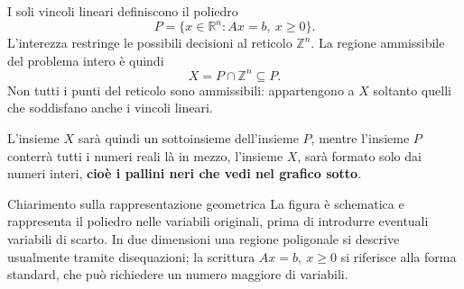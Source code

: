 I soli vincoli lineari definiscono il poliedro
\[
P=\{x\in\mathbb R^n:Ax=b,\ x\geq0\}.
\]
L'interezza restringe le possibili decisioni al reticolo \(\mathbb Z^n\).
La regione ammissibile del problema intero è quindi
\[
X=P\cap\mathbb Z^n\subseteq P.
\]
Non tutti i punti del reticolo sono ammissibili: appartengono a \(X\)
soltanto quelli che soddisfano anche i vincoli lineari.

L'insieme $X$ sarà quindi un sottoinsieme dell'insieme $P$, mentre l'insieme $P$ conterrà tutti i numeri reali là in mezzo, l'insieme $X$, sarà formato solo dai numeri interi, \textbf{cioè i pallini neri che vedi nel grafico sotto}.

\begin{center}
\begin{minipage}{\linewidth}
\centering
\captionsetup{hypcap=false}
\label{fig:pli-reticolo}
\end{minipage}
\end{center}

\begin{remark}{Chiarimento sulla rappresentazione geometrica}
La figura è schematica e rappresenta il poliedro nelle variabili originali,
prima di introdurre eventuali variabili di scarto. In due dimensioni
una regione poligonale si descrive usualmente tramite disequazioni;
la scrittura \(Ax=b,\ x\geq0\) si riferisce alla forma standard,
che può richiedere un numero maggiore di variabili.
\end{remark}


